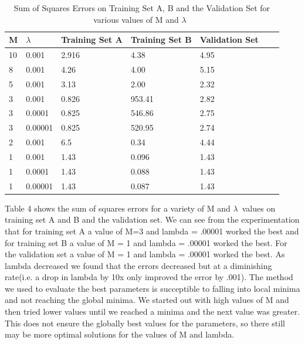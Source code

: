 \documentclass[pageno]{jpaper}
\begin{document}
\begin{table}[h!]
  \centering
  \begin{tabular}{llllll|l}
    \hline
    \textbf{M} & \textbf{$\lambda$\ }  & \textbf{Training Set A}  & \textbf{Training Set B} & \textbf{Validation Set} \\
    \hline
 10 	&0.001 &2.916 &4.38 & 4.95\\
     \hline
 8 	&0.001 &4.26 &4.00 & 5.15\\
    \hline
 5 	&0.001 &3.13 &2.00 & 2.32\\
 \hline
  3 	&0.001 &0.826 &953.41 & 2.82\\
   \hline
  3 	&0.0001 &0.825 &546.86 & 2.75\\
 \hline
  3 	&0.00001 &0.825 &520.95 & 2.74\\
    \hline
  2 	&0.001 &6.5 &0.34 & 4.44\\
 \hline
 1 	&0.001 &1.43 &0.096 & 1.43\\
  \hline
 1 	&0.0001 &1.43 &0.088 & 1.43\\
\hline
 1 	&0.00001 &1.43 &0.087 & 1.43\\
\hline
 
  \end{tabular}
  \caption{Sum of Squares Errors on Training Set A, B and the Validation Set for various values of M and $\lambda$\   }
  \label{table:formatting}
\end{table}

Table 4 shows the sum of squares errors for a variety of M and $\lambda$\ values on training set A and B and the validation set. We can see from the experimentation that for training set A a value of M=3 and lambda = .00001 worked the best and for training set B a value of M = 1 and lambda = .00001 worked the best. For the validation set a value of M = 1 and lambda = .00001 worked the best. As lambda decreased we found that the errors decreased but at a diminishing rate(i.e. a drop in lambda by 10x only improved the error by .001).  The method we used to evaluate the best parameters is succeptible to falling into local minima and not reaching the global minima. We started out with high values of M and then tried lower values until we reached a minima and the next value was greater. This does not ensure the globally best values for the parameters, so there still may be more optimal solutions for the values of M and lambda.
\end{document}
